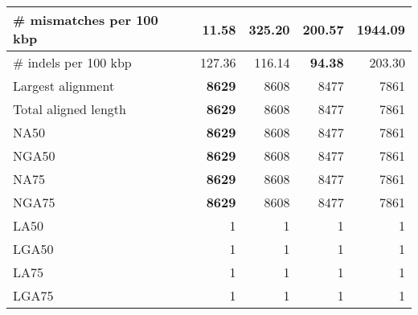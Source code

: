 \documentclass[12pt,a4paper]{article}
\begin{document}
\begin{table}[ht]
\begin{center}
\begin{tabular}{|l*{4}{|r}|}
\# mismatches per 100 kbp & {\bf 11.58} & 325.20 & 200.57 & 1944.09 \\ \hline
\# indels per 100 kbp & 127.36 & 116.14 & {\bf 94.38} & 203.30 \\ \hline
Largest alignment & {\bf 8629} & 8608 & 8477 & 7861 \\ \hline
Total aligned length & {\bf 8629} & 8608 & 8477 & 7861 \\ \hline
NA50 & {\bf 8629} & 8608 & 8477 & 7861 \\ \hline
NGA50 & {\bf 8629} & 8608 & 8477 & 7861 \\ \hline
NA75 & {\bf 8629} & 8608 & 8477 & 7861 \\ \hline
NGA75 & {\bf 8629} & 8608 & 8477 & 7861 \\ \hline
LA50 & 1 & 1 & 1 & 1 \\ \hline
LGA50 & 1 & 1 & 1 & 1 \\ \hline
LA75 & 1 & 1 & 1 & 1 \\ \hline
LGA75 & 1 & 1 & 1 & 1 \\ \hline
\end{tabular}
\end{center}
\end{table}
\end{document}
